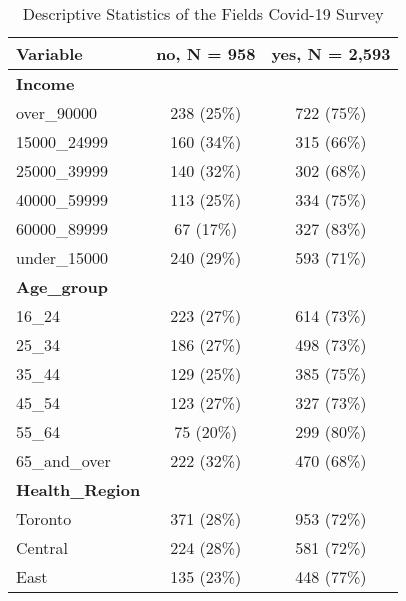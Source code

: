 \documentclass[
  letterpaper,
  DIV=11,
  numbers=noendperiod]{scrartcl}
\begin{document}
\hypertarget{tbl-descriptive-stats}{}
\begin{table}
\caption{\label{tbl-descriptive-stats}Descriptive Statistics of the Fields Covid-19 Survey }\tabularnewline

\centering\begingroup\fontsize{9}{11}\selectfont

\begin{tabular}{lcc}
\toprule
\textbf{Variable} & \textbf{no}, N = 958 & \textbf{yes}, N = 2,593\\
\midrule
\textbf{Income} &  & \\
\hspace{1em}over\_90000 & 238 (25\%) & 722 (75\%)\\
\hspace{1em}15000\_24999 & 160 (34\%) & 315 (66\%)\\
\hspace{1em}25000\_39999 & 140 (32\%) & 302 (68\%)\\
\hspace{1em}40000\_59999 & 113 (25\%) & 334 (75\%)\\
\addlinespace
\hspace{1em}60000\_89999 & 67 (17\%) & 327 (83\%)\\
\hspace{1em}under\_15000 & 240 (29\%) & 593 (71\%)\\
\textbf{Age\_group} &  & \\
\hspace{1em}16\_24 & 223 (27\%) & 614 (73\%)\\
\hspace{1em}25\_34 & 186 (27\%) & 498 (73\%)\\
\addlinespace
\hspace{1em}35\_44 & 129 (25\%) & 385 (75\%)\\
\hspace{1em}45\_54 & 123 (27\%) & 327 (73\%)\\
\hspace{1em}55\_64 & 75 (20\%) & 299 (80\%)\\
\hspace{1em}65\_and\_over & 222 (32\%) & 470 (68\%)\\
\textbf{Health\_Region} &  & \\
\addlinespace
\hspace{1em}Toronto & 371 (28\%) & 953 (72\%)\\
\hspace{1em}Central & 224 (28\%) & 581 (72\%)\\
\hspace{1em}East & 135 (23\%) & 448 (77\%)\\

\end{tabular}
\end{table}
\end{document}
